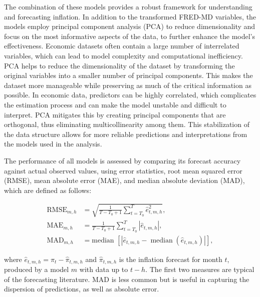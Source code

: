The combination of these models provides a robust framework for understanding and forecasting inflation. In addition to the transformed FRED-MD variables, the models employ principal component analysis (PCA) to reduce dimensionality and focus on the most informative aspects of the data, to further enhance the model's effectiveness. Economic datasets often contain a large number of interrelated variables, which can lead to model complexity and computational inefficiency. PCA helps to reduce the dimensionality of the dataset by transforming the original variables into a smaller number of principal components. This makes the dataset more manageable while preserving as much of the critical information as possible. In economic data, predictors can be highly correlated, which complicates the estimation process and can make the model unstable and difficult to interpret. PCA mitigates this by creating principal components that are orthogonal, thus eliminating multicollinearity among them. This stabilization of the data structure allows for more reliable predictions and interpretations from the models used in the analysis.

The performance of all models is assessed by comparing its forecast accuracy against actual observed values, using error statistics, root mean squared error (RMSE), mean absolute error (MAE), and median absolute deviation (MAD), which are defined as follows:

\begin{equation}
\label{eq:errors}
\begin{aligned}
\operatorname{RMSE}_{m, h} &= \sqrt{\frac{1}{T-T_0+1} \sum_{t=T_0}^T \widehat{e}_{t, m, h}^2}, \\
\operatorname{MAE}_{m, h} &= \frac{1}{T-T_0+1} \sum_{t=T_0}^T\left|\widehat{e}_{t, m, h}\right|, \\
\mathrm{MAD}_{m, h} &= \text{median }\left[\left|\widehat{e}_{t, m, h}-\operatorname{median}\left(\widehat{e}_{t, m, h}\right)\right|\right],
\end{aligned}
\end{equation}


where $\widehat{e}_{t, m, h}=\pi_t-\widehat{\pi}_{t, m, h}$ and $\widehat{\pi}_{t, m, h}$ is the inflation forecast for month $t$, produced by a model $m$ with data up to $t-h$. The first two measures are typical of the forecasting literature. MAD is less common but is useful in capturing the dispersion of predictions, as well as absolute error.




